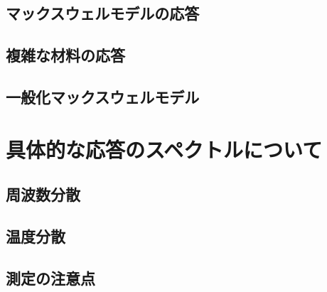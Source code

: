 \documentclass[uplatex,dvipdfmx,a4paper,11pt]{jsarticle}
\begin{document}
\subsection{マックスウェルモデルの応答}

\subsection{複雑な材料の応答}

\subsection{一般化マックスウェルモデル}


\section{具体的な応答のスペクトルについて}

\subsection{周波数分散}

\subsection{温度分散}

\subsection{測定の注意点}
\end{document}
